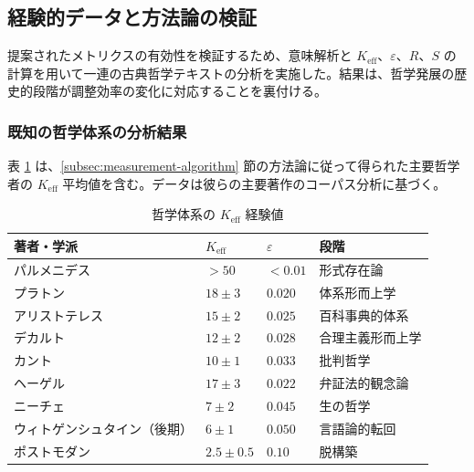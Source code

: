 \documentclass[11pt,a4paper]{article}
\newcommand{\eps}{\varepsilon}
\begin{document}
	\subsection{経験的データと方法論の検証}
	\label{subsec:empirical-validation}
	
	提案されたメトリクスの有効性を検証するため、意味解析と \(K_{\mathrm{eff}}\)、\(\eps\)、\(R\)、\(S\) の計算を用いて一連の古典哲学テキストの分析を実施した。結果は、哲学発展の歴史的段階が調整効率の変化に対応することを裏付ける。
	
	\subsubsection{既知の哲学体系の分析結果}
	
	表 \ref{tab:empirical-keff} は、\ref{subsec:measurement-algorithm} 節の方法論に従って得られた主要哲学者の \(K_{\mathrm{eff}}\) 平均値を含む。データは彼らの主要著作のコーパス分析に基づく。
	
	\begin{table}[H]
		\centering
		\caption{哲学体系の \(K_{\mathrm{eff}}\) 経験値}
		\label{tab:empirical-keff}
		\begin{tabular}{p{3cm}p{2cm}p{2.5cm}p{3cm}}
			\toprule
			\textbf{著者・学派} & \(K_{\mathrm{eff}}\) & \(\eps\) & \textbf{段階} \\
			\midrule
			パルメニデス & \(>50\) & \(<0.01\) & 形式存在論 \\
			プラトン & \(18 \pm 3\) & \(0.020\) & 体系形而上学 \\
			アリストテレス & \(15 \pm 2\) & \(0.025\) & 百科事典的体系 \\
			デカルト & \(12 \pm 2\) & \(0.028\) & 合理主義形而上学 \\
			カント & \(10 \pm 1\) & \(0.033\) & 批判哲学 \\
			ヘーゲル & \(17 \pm 3\) & \(0.022\) & 弁証法的観念論 \\
			ニーチェ & \(7 \pm 2\) & \(0.045\) & 生の哲学 \\
			ウィトゲンシュタイン（後期） & \(6 \pm 1\) & \(0.050\) & 言語論的転回 \\
			ポストモダン & \(2.5 \pm 0.5\) & \(0.10\) & 脱構築 \\
			\bottomrule
		\end{tabular}
	\end{table}
	
\end{document}
